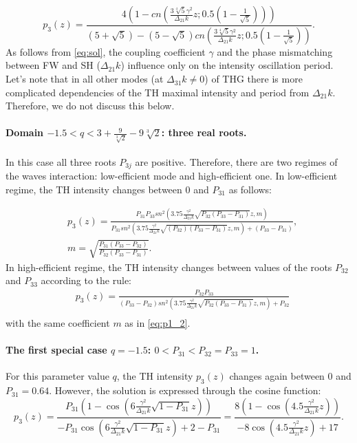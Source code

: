 \documentclass[a4paper, 12pt, onecolumn]{extarticle}
\begin{document}
\begin{equation}
\label{eq:sol}
p_3(z)=\frac{4(1-cn(\frac{3\sqrt[4]{5}\gamma^2}{\Delta_{21}k}z; 0.5(1-\frac{1}{\sqrt{5}})))}{(5+\sqrt{5})-(5-\sqrt{5})cn(\frac{3\sqrt[4]{5}\gamma^2}{\Delta_{21}k}z; 0.5(1-\frac{1}{\sqrt{5}}))}.
\end{equation}
As follows from \eqref{eq:sol}, the coupling coefficient \(\gamma\) and the phase mismatching between FW and SH (\(\Delta_{21}k\))  influence only on the intensity oscillation period. Let's note that in all other modes (at $\Delta_{31}k\ne0$) of THG there is more complicated dependencies of the TH maximal intensity and period  from $\Delta_{21}k$. Therefore, we do not discuss this below. 

\paragraph*{Domain $-1.5<q<3 + \frac{9}{\sqrt[3]{2}}-9\sqrt[3]{ 2}$: three real roots.} 
In this case all three roots $P_{3j}$ are positive. Therefore, there are two regimes of the waves interaction: low-efficient mode and high-efficient one. In low-efficient regime, the TH intensity changes between $0$ and $P_{31}$ as follows:  

\begin{equation}
\label{eq:p1_2}
\begin{aligned}
&p_3(z)=\frac{P_{31}P_{33}sn^2(3.75\frac{\gamma^2}{\Delta_{21}k}\sqrt{P_{32}(P_{33}-P_{31})}z,m)}{P_{31}sn^2(3.75\frac{\gamma^2}{\Delta_{21}k} \sqrt{(P_{32})(P_{33}-P_{31})}z,m)+(P_{33}-P_{31})},\\
&m=\sqrt{\frac{P_{31}(P_{33}-P_{32})}{P_{32}(P_{33}-P_{31})}}.
\end{aligned}
\end{equation} 
In high-efficient regime, the TH intensity changes between values of the roots $P_{32}$ and $P_{33}$ according to the rule:
\begin{equation}
\label{eq:p1_2bis}
\begin{aligned}
&p_3(z)=\frac{P_{32}P_{33}}{(P_{33}-P_{32})sn^2(3.75\frac{\gamma^2}{\Delta_{21}k}\sqrt{P_{32}(P_{33}-P_{31})}z,m)+P_{32}}\\
\end{aligned}
\end{equation}
with the same coefficient $m$ as in \eqref{eq:p1_2}.

\paragraph*{The first special case $q=-1.5$: $0<P_{31}<P_{32}=P_{33}=1$.}
For this parameter value  $q$, the TH intensity $p_3(z)$  changes again between $0$ and $P_{31}=0.64$. However, the solution is expressed through the cosine function:
\begin{equation}
\label{eq:p1_3}
p_3(z)=\frac{P_{31}(1-\cos(6\frac{\gamma^2}{\Delta_{21}k}\sqrt{1-P_{31}}z))}{-P_{31}\cos(6\frac{\gamma^2}{\Delta_{21}k}\sqrt{1-P_{31}}z)+2-P_{31}}=\frac{8(1-\cos(4.5\frac{\gamma^2}{\Delta_{21}k}z))}{-8\cos(4.5\frac{\gamma^2}{\Delta_{21}k}z)+17}.
\end{equation}
\end{document}

